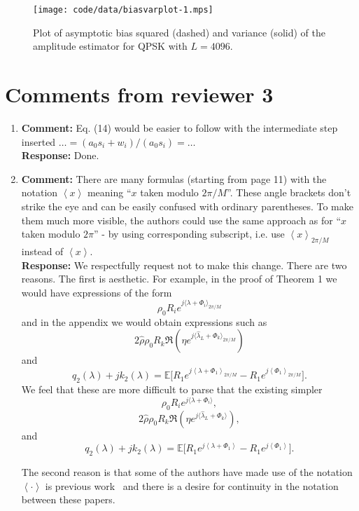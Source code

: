 \documentclass{article}
\newcommand{\fracpart}[1]{\left\langle #1 \right\rangle}
\newcommand{\sfracpart}[1]{\langle #1 \rangle}
\newcommand{\expect}{{\mathbb E}}
\begin{document}
\begin{figure}[tp]  
	\centering  
		\texttt{[image: code/data/biasvarplot-1.mps]}
		\caption{Plot of asymptotic bias squared (dashed) and variance (solid) of the amplitude estimator for QPSK with $L=4096$.}
		\label{fig:biasvarcomp}
\end{figure}


\section{Comments from reviewer 3}

\begin{enumerate}

\item \textbf{Comment:}  Eq. (14) would be easier to follow with the intermediate step inserted $\dots = (a_0s_i + w_i)/(a_0s_i) = \dots$ \\
\textbf{Response:} Done.

\item \textbf{Comment:}  There are many formulas (starting from page 11) with the notation $\fracpart{x}$ meaning ``$x$ taken modulo $2\pi/M$''. These angle brackets don't strike the eye and can be easily confused with ordinary parentheses. To make them much more visible, the authors could use the same approach as for ``$x$ taken modulo $2\pi$'' - by using corresponding subscript, i.e. use $\fracpart{x}_{2\pi/M}$ instead of $\fracpart{x}$. \\
\textbf{Response:} We respectfully request not to make this change.  There are two reasons.  The first is aesthetic.  For example, in the proof of Theorem 1 we would have expressions of the form
\[
\rho_0 R_i e^{j\sfracpart{\lambda + \Phi_i}_{2\pi/M}}
\]
and in the appendix we would obtain expressions such as
\[
2 \hat{\rho} \rho_0 R_k \Re\left( \eta e^{j\sfracpart{\hat{\lambda}_L + \Phi_k}_{2\pi/M}}\right)
\]
and
\[
q_2(\lambda) + j k_2(\lambda) = \expect\big[ R_1 e^{j\fracpart{\lambda + \Phi_1}_{2\pi/M}} - R_1 e^{j\fracpart{\Phi_1}_{2\pi/M}}  \big].
\]
We feel that these are more difficult to parse that the existing simpler
\[
\rho_0 R_i e^{j\sfracpart{\lambda + \Phi_i}},
\]
\[
2 \hat{\rho} \rho_0 R_k \Re\left( \eta e^{j\sfracpart{\hat{\lambda}_L + \Phi_k}}\right),
\]
and
\[
q_2(\lambda) + j k_2(\lambda) = \expect\big[ R_1 e^{j\fracpart{\lambda + \Phi_1}} - R_1 e^{j\fracpart{\Phi_1}}  \big].
\]

The second reason is that some of the authors have made use of the notation $\fracpart{\cdot}$ is previous work~\cite{McKilliamFrequencyEstimationByPhaseUnwrapping2009,McKilliam_mean_dir_est_sq_arc_length2010,McKilliam_pps_unwrapping_tsp_2014} and there is a desire for continuity in the notation between these papers.

 \end{enumerate}
\end{document}
